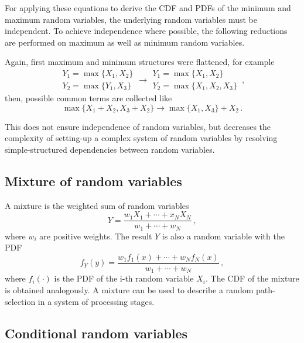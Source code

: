 For applying these equations to derive the CDF and PDFs of the minimum and maximum random variables, the 
underlying random variables must be independent. To achieve independence where possible, the following 
reductions are performed on maximum as well as minimum random variables.

Again, first maximum and minimum structures were flattened, for example
\begin{equation}
 \begin{array}{l}
  Y_1 = \max\{X_1,X_2\}\\
  Y_2 = \max\{Y_1,X_3\}
 \end{array} \longrightarrow
 \begin{array}{l}
  Y_1 = \max\{X_1,X_2\}\\
  Y_2 = \max\{X_1,X_2,X_3\}
 \end{array}\,, \nonumber
\end{equation}
then, possible common terms are collected like
\begin{equation}
 \max\{X_1 + X_2, X_3 + X_2\} \longrightarrow \max\{X_1,X_3\}+X_2\,. \nonumber
\end{equation}

This does not ensure independence of random variables, but decreases the complexity of
setting-up a complex system of random variables by resolving simple-structured 
dependencies between random variables.

\subsection{Mixture of random variables}
A mixture is the weighted sum of random variables
\begin{equation}
 Y = \frac{w_1X_1+\cdots+x_NX_N}{w_1+\cdots+w_N}\,, \nonumber
\end{equation}
where $w_i$ are positive weights. The result $Y$ is also a random variable with the PDF
\begin{equation}
 f_Y(y) = \frac{w_1f_1(x)+\cdots+w_Nf_N(x)}{w_1+\cdots+w_N}\,,\nonumber
\end{equation}
where $f_i(\cdot)$ is the PDF of the i-th random variable $X_i$. The CDF of the
mixture is obtained analogously. A mixture can be used to describe a random 
path-selection in a system of processing stages. 

\subsection{Conditional random variables}


